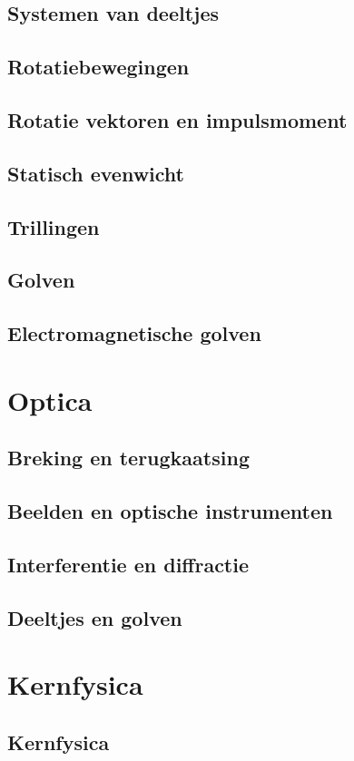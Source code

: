 \documentclass[12pt]{report}
\begin{document}
\chapter{Systemen van deeltjes}

\chapter{Rotatiebewegingen}

\chapter{Rotatie vektoren en impulsmoment}

\chapter{Statisch evenwicht}

\chapter{Trillingen}

\chapter{Golven}

\chapter{Electromagnetische golven}

\part{Optica}

\chapter{Breking en terugkaatsing}

\chapter{Beelden en optische instrumenten}

\chapter{Interferentie en diffractie}

\chapter{Deeltjes en golven}

\part{Kernfysica}
\chapter{Kernfysica}
\end{document}
